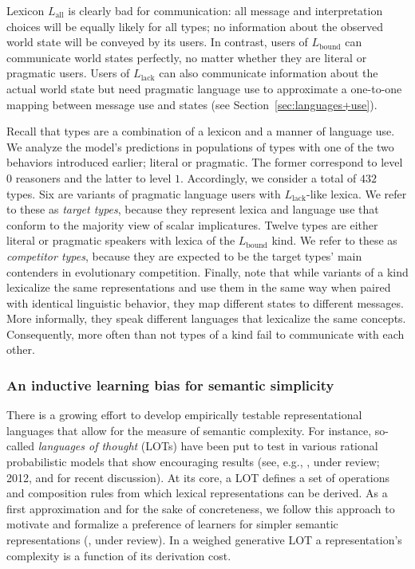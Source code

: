 \documentclass[a4paper, 11pt]{article}
\theoremstyle{Satz}
\newcommand{\mylang}[1]{\ensuremath{L_{\text{#1}}}\xspace} %
\newcommand{\Lall}{\mylang{all}}
\newcommand{\Lbound}{\mylang{bound}}
\newcommand{\Llack}{\mylang{lack}}
\begin{document}
Lexicon $\Lall$ is clearly bad for communication: all message and interpretation choices will
be equally likely for all types; no information about the observed world state will be conveyed
by its users. In contrast, users of $\Lbound$ can communicate world states perfectly, no matter
whether they are literal or pragmatic users. Users of $\Llack$ can also communicate information
about the actual world state but need pragmatic language use to approximate a one-to-one
mapping between message use and states (see Section~\ref{sec:languages+use}).  

Recall that types are a combination of a lexicon and a manner of language use. We analyze the
model's predictions in populations of types with one of the two behaviors introduced earlier;
literal or pragmatic. The former correspond to level $0$ reasoners and the latter to level
$1$. Accordingly, we consider a total of $432$ types. Six are variants of pragmatic language
users with $\Llack$-like lexica. We refer to these as \emph{target types}, because they
represent lexica and language use that conform to the majority view of scalar
implicatures. Twelve types are either literal or pragmatic speakers with lexica of the
$\Lbound$ kind. We refer to these as \emph{competitor types}, because they are expected to be
the target types' main contenders in evolutionary competition. Finally, note that while variants of a kind
lexicalize the same representations and use them in the same way when paired with identical linguistic behavior,
they map different states to different messages. More informally, they speak different languages
that lexicalize the same concepts. Consequently, more often than not types of a kind fail to communicate with each other. 




\subsubsection{An inductive learning bias for semantic simplicity}
\label{sec:an-induct-learn}

There is a growing effort to develop empirically testable representational languages that allow
for the measure of semantic complexity. For instance, so-called {\em languages of thought}
(LOTs) have been put to test in various rational probabilistic models that show encouraging
results (see, e.g., \citealt{katz+etal:2008}, \citeauthor{piantadosi+etal:underreview} under review; 2012, and \citealt{piantadosi+jacobs:2016} for recent discussion). At its
core, a LOT defines a set of operations and composition rules from which lexical representations can be
derived. As a first approximation and for the sake of concreteness, we follow this approach to
motivate and formalize a preference of learners for simpler semantic representations
(\citealt{feldman:2000, chater+vitanyi:2003, piantadosi+etal:2012a,kirby+etal:2015}, \citeauthor{piantadosi+etal:underreview} under review). 
In a weighed generative LOT a representation's complexity is a function of its derivation cost.
\end{document}
